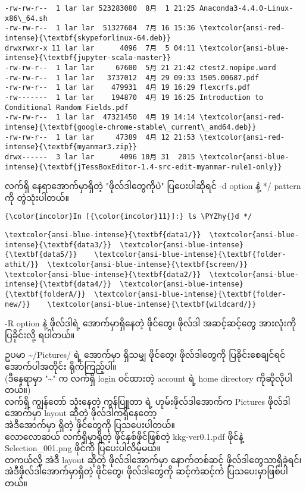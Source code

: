 \documentclass[11pt]{article}
\def\PYZhy{\char`\-}
\begin{document}
\begin{Verbatim}[commandchars=\\\{\}]
-rw-rw-r--  1 lar lar 523283080  8月  1 21:25 Anaconda3-4.4.0-Linux-x86\_64.sh
-rw-rw-r--  1 lar lar  51327604  7月 16 15:36 \textcolor{ansi-red-intense}{\textbf{skypeforlinux-64.deb}}
drwxrwxr-x 11 lar lar      4096  7月  5 04:11 \textcolor{ansi-blue-intense}{\textbf{jupyter-scala-master}}
-rw-rw-r--  1 lar lar     67600  5月 21 21:42 ctest2.nopipe.word
-rw-rw-r--  1 lar lar   3737012  4月 29 09:33 1505.00687.pdf
-rw-rw-r--  1 lar lar    479931  4月 19 16:29 flexcrfs.pdf
-rw-------  1 lar lar    194870  4月 19 16:25 Introduction to Conditional Random Fields.pdf
-rw-rw-r--  1 lar lar  47321450  4月 19 14:14 \textcolor{ansi-red-intense}{\textbf{google-chrome-stable\_current\_amd64.deb}}
-rw-rw-r--  1 lar lar     47389  4月 12 21:53 \textcolor{ansi-red-intense}{\textbf{myanmar3.zip}}
drwx------  3 lar lar      4096 10月 31  2015 \textcolor{ansi-blue-intense}{\textbf{jTessBoxEditor-1.4-src-edit-myanmar-rule1-only}}

    \end{Verbatim}

    လက်ရှိ နေရာအောက်မှာရှိတဲ့ "ဖိုလ်ဒါတွေကိုပဲ" ပြပေးပါဆိုရင် -d option နဲ့
*/ pattern ကို တွဲသုံးပါတယ်။

    \begin{Verbatim}[commandchars=\\\{\}]
{\color{incolor}In [{\color{incolor}11}]:} ls \PYZhy{}d */
\end{Verbatim}

    \begin{Verbatim}[commandchars=\\\{\}]
\textcolor{ansi-blue-intense}{\textbf{data1/}}  \textcolor{ansi-blue-intense}{\textbf{data3/}}  \textcolor{ansi-blue-intense}{\textbf{data5/}}    \textcolor{ansi-blue-intense}{\textbf{folder-athit/}}  \textcolor{ansi-blue-intense}{\textbf{screen/}}
\textcolor{ansi-blue-intense}{\textbf{data2/}}  \textcolor{ansi-blue-intense}{\textbf{data4/}}  \textcolor{ansi-blue-intense}{\textbf{folderA/}}  \textcolor{ansi-blue-intense}{\textbf{folder-new/}}    \textcolor{ansi-blue-intense}{\textbf{wildcard/}}

    \end{Verbatim}

    -R option နဲ့ ဖိုလ်ဒါရဲ့ အောက်မှာရှိနေတဲ့ ဖိုင်တွေ၊ ဖိုလ်ဒါ အဆင့်ဆင့်တွေ
အားလုံးကို ပြခိုင်းလို့ ရပါတယ်။

ဥပမာ \textasciitilde{}/Pictures/ ရဲ့ အောက်မှာ ရှိသမျှ ဖိုင်တွေ၊
ဖိုလ်ဒါတွေကို ပြခိုင်းစေချင်ရင် အောက်ပါအတိုင်း ရိုက်ကြည့်ပါ။\\
(ဒီနေရာမှာ "\textasciitilde{}" က လက်ရှိ login ဝင်ထားတဲ့ account ရဲ့ home
directory ကိုဆိုလိုပါတယ်။)\\
လက်ရှိ ကျွန်တော် သုံးနေတဲ့ ကွန်ပြူတာ ရဲ့ ဟုမ်းဖိုလ်ဒါအောက်က Pictures
ဖိုလ်ဒါအောက်မှာ layout ဆိုတဲ့ ဖိုလ်ဒါကရှိနေတော့\\
အဲဒီအောက်မှာ ရှိတဲ့ ဖိုင်တွေကို ပြသပေးပါတယ်။\\
လောလောဆယ် လက်ရှိမှာရှိတဲ့ ဖိုင်နှစ်ဖိုင်ဖြစ်တဲ့ kkg-ver0.1.pdf ဖိုင်နဲ့
Selection\_001.png ဖိုင်ကို ပြပေးပါလိမ့်မယ်။\\
တကယ်လို့ အဲဒီ layout ဆိုတဲ့ ဖိုလ်ဒါအောက်မှာ နောက်တစ်ဆင့်
ဖိုလ်ဒါတွေသာရှိခဲ့ရင်၊ အဲဒီဖိုလ်ဒါအောက်မှာရှိတဲ့ ဖိုင်တွေ၊ ဖိုလ်ဒါတွေကို
ဆင့်ကဲဆင့်ကဲ ပြသပေးမှာဖြစ်ပါတယ်။
\end{document}
